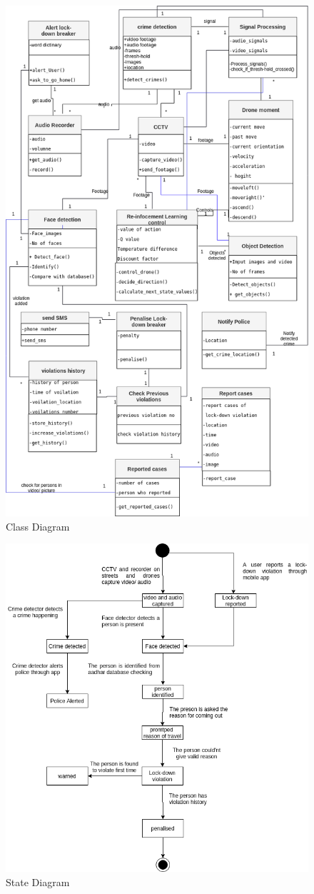 \documentclass[10pt,twocolumn,letterpaper]{article}
\begin{document}
 \begin{figure}
    \includegraphics[height=.7\textwidth, width=.55\textwidth]{images/class_diagram.png} 

    \caption{Class Diagram}
\end{figure}
 \begin{figure}
    \includegraphics[height=.6\textwidth, width=.5\textwidth]{images/state_diagram.png} 

    \caption{State Diagram}
\end{figure}
\end{document}
